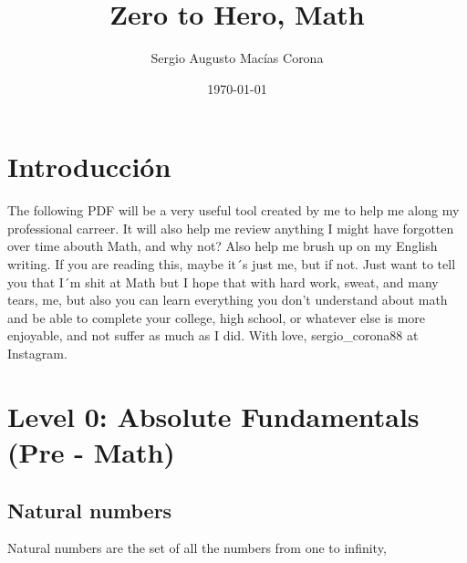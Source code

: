 \documentclass{article} %
\title{Zero to Hero, Math}
\author{Sergio Augusto Macías Corona}
\date{\today} %
\begin{document}
\maketitle

\section{Introducción}

The following PDF will be a very useful tool created by me to help me along my professional carreer. It will also help me review anything I might have forgotten over time abouth Math, and why not? Also help me brush up on my English writing. If you are reading this, maybe it´s just me, but if not. Just want to tell you that I´m shit at Math but I hope that with hard work, sweat, and many tears, me, but also you can learn everything you don't understand about math and be able to complete your college, high school, or whatever else is more enjoyable, and not suffer as much as I did. With love, sergio\_corona88 at Instagram.

\section{Level 0: Absolute Fundamentals (Pre - Math)}
\subsection{Natural numbers}
Natural numbers are the set of all the numbers from one to infinity, 
\end{document}
